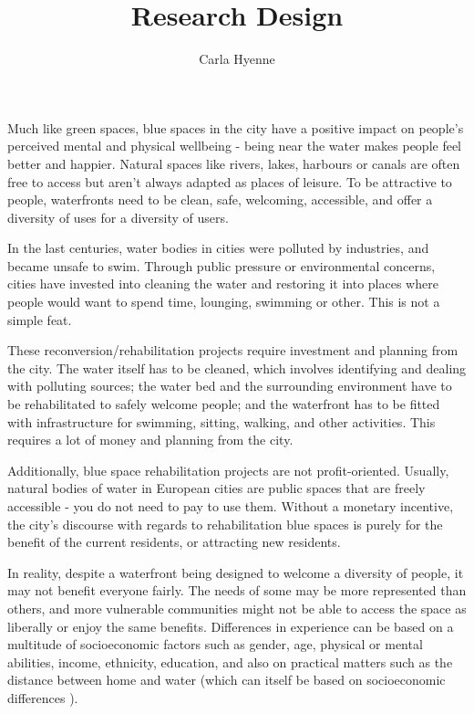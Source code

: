 \documentclass{article}
\title{Research Design}
\author{Carla Hyenne}
\date{}
\begin{document}
\maketitle


Much like green spaces, blue spaces in the city have a positive impact on people's perceived mental and physical wellbeing - being near the water makes people feel better and happier. Natural spaces like rivers, lakes, harbours or canals are often free to access but aren't always adapted as places of leisure. To be attractive to people, waterfronts need to be clean, safe, welcoming, accessible, and offer a diversity of uses for a diversity of users. 

In the last centuries, water bodies in cities were polluted by industries, and became unsafe to swim. Through public pressure or environmental concerns, cities have invested into cleaning the water and restoring it into places where people would want to spend time, lounging, swimming or other. This is not a simple feat. 

These reconversion/rehabilitation projects require investment and planning from the city. The water itself has to be cleaned, which involves identifying and dealing with polluting sources; the water bed and the surrounding environment have to be rehabilitated to safely welcome people; and the waterfront has to be fitted with infrastructure for swimming, sitting, walking, and other activities.
This requires a lot of money and planning from the city.

Additionally, blue space rehabilitation projects are not profit-oriented. Usually, natural bodies of water in European cities are public spaces that are freely accessible - you do not need to pay to use them. Without a monetary incentive, the city's discourse with regards to rehabilitation blue spaces is purely for the benefit of the current residents, or attracting new residents.

In reality, despite a waterfront being designed to welcome a diversity of people, it may not benefit everyone fairly. The needs of some may be more represented than others, and more vulnerable communities might not be able to access the space as liberally or enjoy the same benefits. Differences in experience can be based on a multitude of socioeconomic factors such as gender, age, physical or mental abilities, income, ethnicity, education, and also on practical matters such as the distance between home and water (which can itself be based on socioeconomic differences ). 
\end{document}
